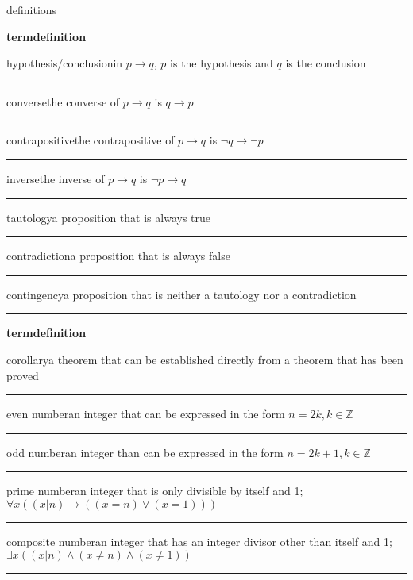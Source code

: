 \documentclass{article}
\newcommand{\twoPartStatement}[2]{
    \noindent\parbox{\linewidth}{
        #1\hfill#2
        \par
        \vspace{.5\baselineskip}
        \hrule
        \vspace{.5\baselineskip}
    }
}
\newcommand{\twoFields}[2]{
    \noindent
    \textbf{#1}\hfill\textbf{#2} \\
    \par
}
\newcommand{\sectionTitle}[1]{
    \begin{center}
        \large #1
    \end{center}
}
\begin{document}
\sectionTitle{definitions}
\begin{multicols}{2}
    \raggedcolumns
    \twoFields{term}{definition}
    \twoPartStatement
        {hypothesis/conclusion}
        {in $p\rightarrow q$, $p$ is the hypothesis and $q$ is the conclusion}
    \twoPartStatement
        {converse}
        {the converse of $p\rightarrow q$ is $q\rightarrow p$}
    \twoPartStatement
        {contrapositive}
        {the contrapositive of $p\rightarrow q$ is $\neg q\rightarrow\neg p$}
    \twoPartStatement
        {inverse}
        {the inverse of $p\rightarrow q$ is $\neg p\rightarrow q$}
    \twoPartStatement
        {tautology}
        {a proposition that is always true}
    \twoPartStatement
        {contradiction}
        {a proposition that is always false}
    \twoPartStatement
        {contingency}
        {a proposition that is neither a tautology nor a contradiction}
    \twoFields{term}{definition}
    \twoPartStatement
        {corollary}
        {a theorem that can be established directly from a theorem that has been proved}
    \twoPartStatement
        {even number}
        {an integer that can be expressed in the form $n=2k,k\in\mathbb{Z}$}
    \twoPartStatement
        {odd number}
        {an integer than can be expressed in the form $n=2k+1,k\in\mathbb{Z}$}
    \twoPartStatement
        {prime number}
        {an integer that is only divisible by itself and 1; $\forall x((x|n)\rightarrow ((x=n)\lor(x=1)))$}
    \twoPartStatement
        {composite number}
        {an integer that has an integer divisor other than itself and 1; $\exists x((x|n)\land(x\neq n)\land(x\neq 1))$}
\end{multicols}
\end{document}
